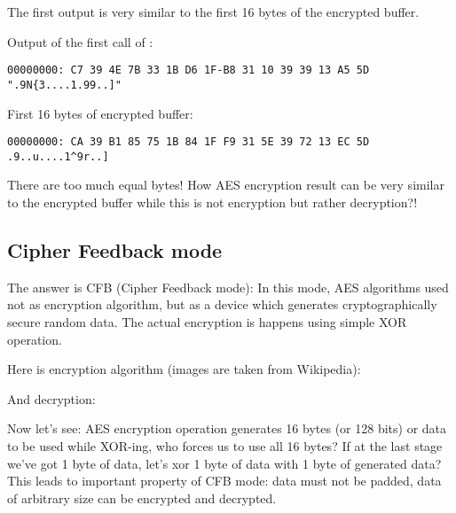 The first output is very similar to the first 16 bytes of the encrypted buffer.

Output of the first call of :

\begin{lstlisting}
00000000: C7 39 4E 7B 33 1B D6 1F-B8 31 10 39 39 13 A5 5D ".9N{3....1.99..]"
\end{lstlisting}

First 16 bytes of encrypted buffer:

\begin{lstlisting}
00000000: CA 39 B1 85 75 1B 84 1F F9 31 5E 39 72 13 EC 5D  .9..u....1^9r..]
\end{lstlisting}

There are too much equal bytes!
How AES encryption result can be very similar to the encrypted buffer while this is not
encryption but rather decryption?!

\subsection{Cipher Feedback mode}

The answer is CFB (Cipher Feedback mode):
In this mode, AES algorithms used not as encryption algorithm, but as a device which generates cryptographically secure random data.
The actual encryption is happens using simple XOR operation.

Here is encryption algorithm (images are taken from Wikipedia):

\begin{figure}[H]
\centering
{}
\end{figure}

And decryption:

\begin{figure}[H]
\centering
{}
\label{fig:CFB_decryption}
\end{figure}

Now let's see: AES encryption operation generates 16 bytes (or 128 bits) or  data
to be used while XOR-ing, who forces us to use all 16 bytes?
If at the last stage we've got 1 byte of data, let's xor 1 byte of data with 1 byte of generated
 data?
This leads to important property of CFB mode: data must not be padded, data of arbitrary size
can be encrypted and decrypted.

